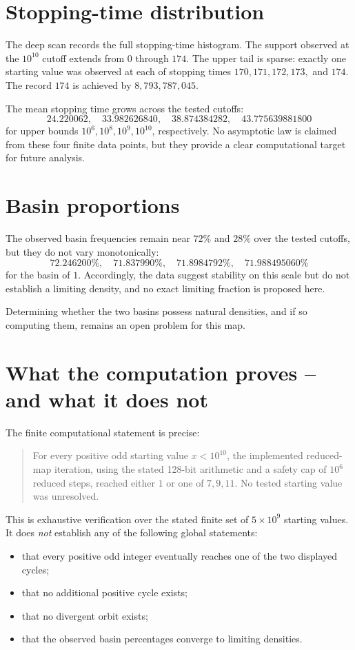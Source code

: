 \documentclass[11pt]{article}
\begin{document}
\section{Stopping-time distribution}

The deep scan records the full stopping-time histogram. The support observed at the \(10^{10}\) cutoff extends from \(0\) through \(174\). The upper tail is sparse: exactly one starting value was observed at each of stopping times \(170,171,172,173,\) and \(174\). The record \(174\) is achieved by \(8{,}793{,}787{,}045\).

The mean stopping time grows across the tested cutoffs:
\[
24.220062,\quad
33.982626840,\quad
38.874384282,\quad
43.775639881800
\]
for upper bounds \(10^6,10^8,10^9,10^{10}\), respectively. No asymptotic law is claimed from these four finite data points, but they provide a clear computational target for future analysis.

\section{Basin proportions}

The observed basin frequencies remain near \(72\%\) and \(28\%\) over the tested cutoffs, but they do not vary monotonically:
\[
72.246200\%,\quad
71.837990\%,\quad
71.8984792\%,\quad
71.988495060\%
\]
for the basin of \(1\). Accordingly, the data suggest stability on this scale but do not establish a limiting density, and no exact limiting fraction is proposed here.

Determining whether the two basins possess natural densities, and if so computing them, remains an open problem for this map.

\section{What the computation proves -- and what it does not}

The finite computational statement is precise:

\begin{quote}
For every positive odd starting value \(x<10^{10}\), the implemented reduced-map iteration, using the stated 128-bit arithmetic and a safety cap of \(10^6\) reduced steps, reached either \(1\) or one of \(7,9,11\). No tested starting value was unresolved.
\end{quote}

This is exhaustive verification over the stated finite set of \(5\times10^9\) starting values. It does \emph{not} establish any of the following global statements:
\begin{itemize}
\item that every positive odd integer eventually reaches one of the two displayed cycles;
\item that no additional positive cycle exists;
\item that no divergent orbit exists;
\item that the observed basin percentages converge to limiting densities.
\end{itemize}
\end{document}
